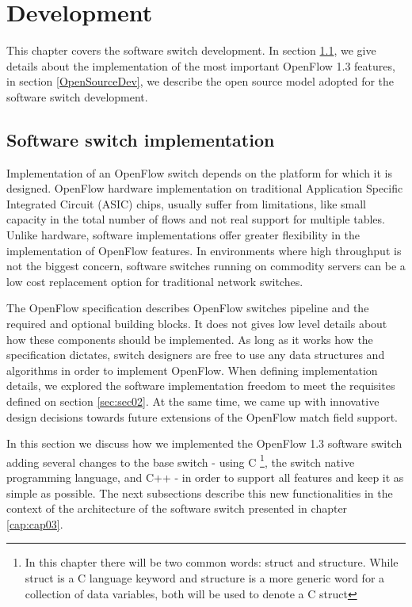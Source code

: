 \chapter{Development}
\label{cap:cap04}

This chapter covers the software switch development. In section \ref{softfeatures}, we give details about the implementation of the most important OpenFlow 1.3 features, in section \ref{OpenSourceDev}, we describe the open source model adopted for the software switch development. 

\section{Software switch implementation}
\label{softfeatures}

Implementation of an OpenFlow switch depends on the platform for which it is designed. OpenFlow hardware implementation on traditional Application Specific Integrated Circuit (ASIC) chips, usually suffer from limitations, like small capacity in the total number of flows and not real support for multiple tables. Unlike hardware, software implementations offer greater flexibility in the implementation of OpenFlow features. In environments where high throughput is not the biggest concern, software switches running on commodity servers can be a low cost replacement option for traditional network switches.

The OpenFlow specification describes OpenFlow switches pipeline and the required and optional building blocks. It does not gives low level details about how these components should be implemented. As long as it works how the specification dictates, switch designers are free to use any data structures and algorithms in order to implement OpenFlow. When defining implementation details, we explored the software implementation freedom to meet the requisites defined on section \ref{sec:sec02}. At the same time, we came up with innovative design decisions towards future extensions of the OpenFlow match field support.  

In this section we discuss how we implemented the OpenFlow 1.3 software switch adding several changes to the base switch - using C \footnote{In this chapter there will be two common words: struct and structure. While struct is a C language keyword and structure is a more generic word for a collection of data variables, both will be used to denote a C struct}, the switch native programming language, and C++ - in order to support all features and keep it as simple as possible. The next subsections describe this new functionalities in the context of the architecture of the software switch presented in chapter \ref{cap:cap03}.

